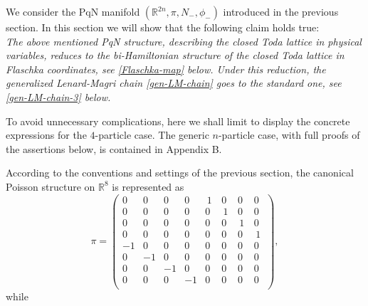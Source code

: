 \documentclass[12pt]{article}
\newcommand{\RR}{{{\mathbb{R}}}}
\begin{document}
We consider the PqN manifold $(\RR^{2n},\pi,N_-,\phi_-)$ introduced in the previous section. %
In this section we will show that the following claim holds true:\\
\indent\emph{The above mentioned PqN structure, describing the closed Toda lattice in %
physical variables, reduces to the bi-Hamiltonian structure of the closed Toda lattice in Flaschka coordinates, %
see \eqref{Flaschka-map} below. 
Under this reduction, the generalized Lenard-Magri chain \eqref{gen-LM-chain} goes to the standard one, see \eqref{gen-LM-chain-3} below.}

To avoid unnecessary complications, here we shall limit to display the concrete expressions for the $4$-particle  case. The generic $n$-particle case, with full proofs of the assertions below, is contained in Appendix B.

According to the conventions and settings of the previous section, the canonical Poisson structure on $\RR^{8}$ is represented as
\begin{equation*} 
\pi%
=\left( \begin {array}{cccc|cccc} 
0&0&0&0&\,1\, &0&0&0\\ %
0&0&0&0&0&\,1\,&0&0\\ %
0&0&0&0&0&0&\,1\,&0\\ %
0&0&0&0&0&0&0&\,1\,\\ %
\hline
-1&0&0&0&0&0&0&0\\ %
0&-1&0&0&0&0&0&0\\ %
0&0&-1&0&0&0&0&0\\ %
0&0&0&-1&0&0&0&0\\ %
\end{array}\right),
\end{equation*}
while
\end{document}
